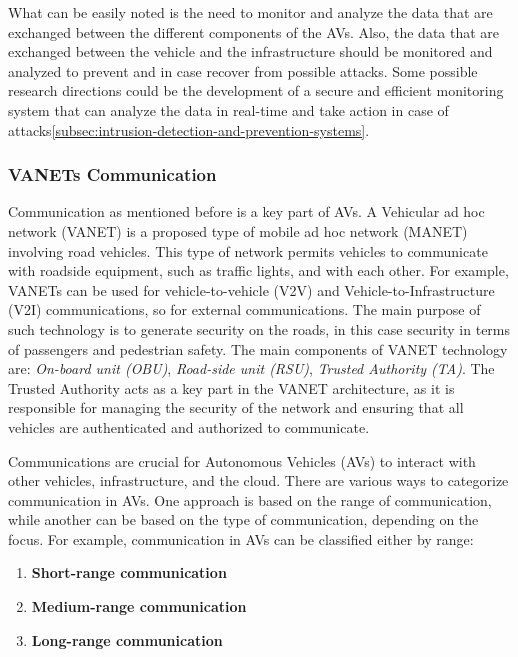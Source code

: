 What can be easily noted is the need to monitor and analyze the data that are exchanged between the different components of the AVs.
Also, the data that are exchanged between the vehicle and the infrastructure should be monitored and analyzed to prevent and in case recover from possible attacks.
Some possible research directions could be the development of a secure and efficient monitoring system that can analyze the data in real-time and take action in case of attacks\ref{subsec:intrusion-detection-and-prevention-systems}.

\subsubsection{VANETs Communication}\label{subsubsec:vanets-communication}

Communication as mentioned before is a key part of AVs.
A Vehicular ad hoc network (VANET) is a proposed type of mobile ad hoc network (MANET) involving road vehicles.
This type of network permits vehicles to communicate with roadside equipment, such as traffic lights, and with each other\cite{sheikh2019comprehensive}.
For example, VANETs can be used for vehicle-to-vehicle (V2V) and Vehicle-to-Infrastructure (V2I) communications, so for external communications.
The main purpose of such technology is to generate security on the roads, in this case security in terms of passengers and pedestrian safety.
The main components of VANET technology are: \textit{On-board unit (OBU)}, \textit{Road-side unit (RSU)}, \textit{Trusted Authority (TA)}.
The Trusted Authority acts as a key part in the VANET architecture,
as it is responsible for managing the security of the network and ensuring that all vehicles are authenticated
and authorized to communicate.

Communications are crucial for Autonomous Vehicles (AVs) to interact with other vehicles, infrastructure, and the cloud.
There are various ways to categorize communication in AVs. One approach is based on the range of communication, while another can be based on the type of communication, depending on the focus.
For example, communication in AVs can be classified either by range:
\begin{enumerate}
    \item \textbf{Short-range communication}
    \item \textbf{Medium-range communication}
    \item \textbf{Long-range communication}
\end{enumerate}

